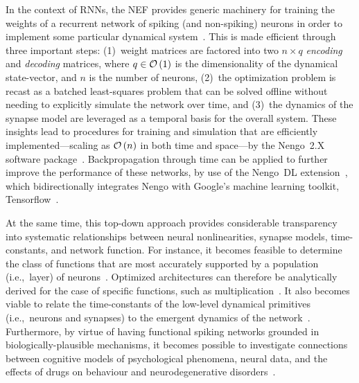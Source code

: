 In the context of RNNs, the NEF provides generic machinery for training the weights of a recurrent network of spiking (and non-spiking) neurons in order to implement some particular dynamical system~\citep{dynamicspatent}.
This is made efficient through three important steps: (1)~weight matrices are factored into two $n \times q$ \emph{encoding} and \emph{decoding} matrices, where $q \in \mathcal{O}\left({1}\right)$ is the dimensionality of the dynamical state-vector, and $n$ is the number of neurons, (2)~the optimization problem is recast as a batched least-squares problem that can be solved offline without needing to explicitly simulate the network over time, and (3)~the dynamics of the synapse model are leveraged as a temporal basis for the overall system.
These insights lead to procedures for training and simulation that are efficiently implemented---scaling as $\mathcal{O}\left({n}\right)$ in both time and space---by the Nengo~2.X software package~\citep{bekolay2013}.
Backpropagation through time can be applied to further improve the performance of these networks, by use of the Nengo~DL extension~\citep{hunsberger2018, rasmussen2018nengodl, blouw2018a}, which bidirectionally integrates Nengo with Google's machine learning toolkit, Tensorflow~\citep{abadi2016tensorflow}.

At the same time, this top-down approach provides considerable transparency into systematic relationships between neural nonlinearities, synapse models, time-constants, and network function.
For instance, it becomes feasible to determine the class of functions that are most accurately supported by a population (i.e.,~layer) of neurons~\citep[][pp.~185--217]{eliasmith2003a}.
Optimized architectures can therefore be analytically derived for the case of specific functions, such as multiplication~\citep{jgosmann2015}.
It also becomes viable to relate the time-constants of the low-level dynamical primitives (i.e.,~neurons and synapses) to the emergent dynamics of the network~\citep{voelker2018}.
Furthermore, by virtue of having functional spiking networks grounded in biologically-plausible mechanisms, it becomes possible to investigate connections between cognitive models of psychological phenomena, neural data, and the effects of drugs on behaviour and neurodegenerative disorders~\citep{eliasmith2013build, eliasmith2016biospaun, duggins2017b}.

